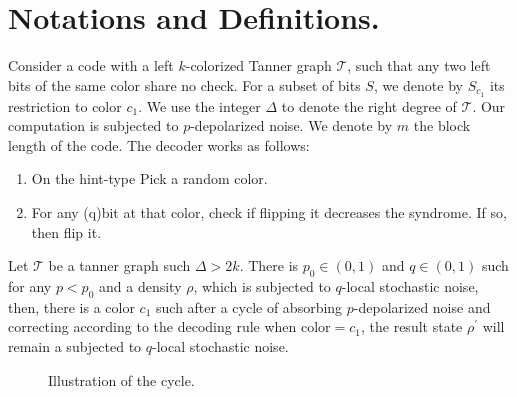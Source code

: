 \documentclass[manuscript,screen,review]{acmart}
\begin{document}
\newcommand{\TT}{ \mathcal{T} }

\section{Notations and Definitions.} Consider a code with a left $k$-colorized Tanner graph $\TT{}$, such that any two left bits of the same color share no check. For a subset of bits $S$, we denote by $S_{c_1}$ its restriction to color $c_1$. We use the integer $\Delta$ to denote the right degree of $\TT{}$. Our computation is subjected to $p$-depolarized noise. We denote by $m$ the block length of the code. The decoder works as follows:
\begin{enumerate}
  \item On the hint-type Pick a random color. 

  \item For any (q)bit at that color, check if flipping it decreases the syndrome. If so, then flip it.
\end{enumerate}




\begin{claim}
  Let $\TT$ be a tanner graph such $\Delta > 2k$. There is $p_{0} \in (0,1)$ and $q \in (0,1)$ such for any $p < p_{0}$ and a density $\rho$, which is subjected to $q$-local stochastic noise, then, there is a color $c_{1}$ such after a cycle of absorbing $p$-depolarized noise and correcting according to the decoding rule when color$=c_{1}$, the result state $\rho^\prime$ will remain a subjected to $q$-local stochastic noise.  
\end{claim}
\begin{figure}[h]
  \begin{center}
\end{center}
\caption{Illustration of the cycle.}
\end{figure}
\end{document}
